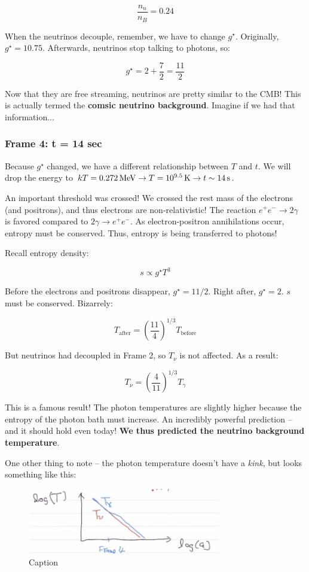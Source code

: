 \documentclass{article}
\newcommand{\unit}[1]{{\,\rm #1}}
\newcommand{\be}{\begin{equation}}
\newcommand{\ee}{\end{equation}}
\newcommand{\s}{\unit{s}}
\begin{document}
\be
\frac{n_n}{n_B} = 0.24
\ee

When the neutrinos decouple, remember, we have to change $g^\star$. Originally, $g^\star = 10.75$. Afterwards, neutrinos stop talking to photons, so:

\be
g^\star = 2 + \frac{7}{2} = \frac{11}{2}
\ee

Now that they are free streaming, neutrinos are pretty similar to the CMB! This is actually termed the \textbf{comsic neutrino background}. Imagine if we had that information...


\subsubsection{Frame 4: t = 14 sec}

Because $g^\star$ changed, we have a different relationship between $T$ and $t$. We will drop the energy to $kT = 0.272 \unit{ MeV} \rightarrow T = 10^{9.5} \unit{ K} \rightarrow t \sim 14 \s$. 

An important threshold was crossed! We crossed the rest mass of the electrons (and positrons), and thus electrons are non-relativistic! The reaction $e^+e^- \rightarrow 2\gamma$ is favored compared to $2\gamma \rightarrow e^+e^-$. As electron-positron annihilations occur, entropy must be conserved. Thus, entropy is being transferred to photons! 

Recall entropy density:

\be
s \propto g^\star T^3
\ee

Before the electrons and positrons disappear, $g^\star = 11/2$. Right after, $g^\star = 2$. $s$ must be conserved. Bizarrely:

\be
T_\text{after} = \left(\frac{11}{4}\right)^{1/3} T_\text{before}
\ee

But neutrinos had decoupled in Frame 2, so $T_\nu$ is not affected. As a result:

\be
T_\nu = \left(\frac{4}{11}\right)^{1/3} T_\gamma
\ee

This is a famous result! The photon temperatures are slightly higher because the entropy of the photon bath must increase. An incredibly powerful prediction -- and it should hold even today! \textbf{We thus predicted the neutrino background temperature}. 

One other thing to note -- the photon temperature doesn't have a \textit{kink}, but looks something like this:

\begin{figure}[h]
    \centering
    \includegraphics[width=0.75\textwidth]{entropy_transfer.png}
    \caption{Caption}
    \label{fig:my_label}
\end{figure}
\end{document}
